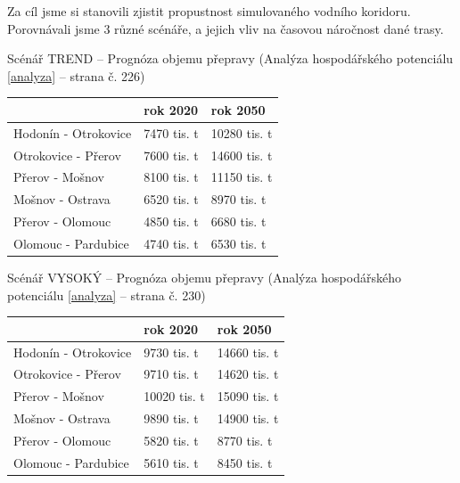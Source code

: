 \documentclass[11pt,a4paper]{article}
\begin{document}
    Za cíl jsme si stanovili zjistit propustnost simulovaného vodního koridoru.
    Porovnávali jsme 3 různé scénáře, a jejich vliv na časovou náročnost dané
    trasy.

    \break

    \noindent 
    Scénář TREND -- Prognóza objemu přepravy (Analýza hospodářského
    potenciálu \ref{analyza} -- strana č. 226)
    \begin{center}
      \begin{tabular}{| l | l | l |}
        \hline
        & rok 2020 & rok 2050 \\ \hline
        Hodonín - Otrokovice & 7470 tis. t & 10280 tis. t \\ \hline
        Otrokovice - Přerov & 7600 tis. t & 14600 tis. t \\ \hline
        Přerov - Mošnov &  8100 tis. t & 11150 tis. t \\ \hline
        Mošnov - Ostrava & 6520 tis. t & 8970 tis. t \\ \hline
        Přerov - Olomouc & 4850 tis. t & 6680 tis. t \\ \hline
        Olomouc - Pardubice & 4740 tis. t & 6530 tis. t \\ \hline
        \end{tabular}
    \end{center}

    \noindent 
    Scénář VYSOKÝ -- Prognóza objemu přepravy (Analýza hospodářského
    potenciálu \ref{analyza} -- strana č. 230)
    \begin{center}
      \begin{tabular}{| l | l | l |}
        \hline
        & rok 2020 & rok 2050 \\ \hline
        Hodonín - Otrokovice & 9730 tis. t & 14660 tis. t \\ \hline
        Otrokovice - Přerov & 9710 tis. t & 14620 tis. t \\ \hline
        Přerov - Mošnov & 10020 tis. t & 15090 tis. t \\ \hline
        Mošnov - Ostrava & 9890 tis. t & 14900 tis. t \\ \hline
        Přerov - Olomouc & 5820 tis. t & 8770 tis. t \\ \hline
        Olomouc - Pardubice & 5610 tis. t & 8450 tis. t \\ \hline
        \end{tabular}
    \end{center}
\end{document}

